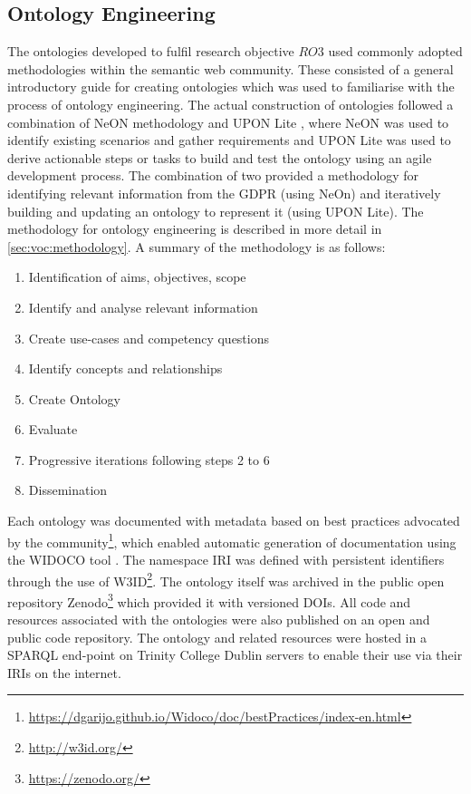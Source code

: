 \subsection{Ontology Engineering}\label{sec:intro:ontology-engineering}
The ontologies developed to fulfil research objective $RO3$ used commonly adopted methodologies within the semantic web community. These consisted of a general introductory guide for creating ontologies \cite{noy_ontology_2001} which was used to familiarise with the process of ontology engineering.
The actual construction of ontologies followed a combination of NeON methodology \cite{suarez-figueroa_neon_2012} and UPON Lite \cite{de_nicola_lightweight_2016}, where NeON was used to identify existing scenarios and gather requirements and UPON Lite was used to derive actionable steps or tasks to build and test the ontology using an agile development process.
The combination of two provided a methodology for identifying relevant information from the GDPR (using NeOn) and iteratively building and updating an ontology to represent it (using UPON Lite).
The methodology for ontology engineering is described in more detail in \autoref{sec:voc:methodology}.
A summary of the methodology is as follows:
\begin{enumerate}
	\item Identification of aims, objectives, scope
    \item Identify and analyse relevant information
    \item Create use-cases and competency questions
    \item Identify concepts and relationships
    \item Create Ontology
    \item Evaluate
    \item Progressive iterations following steps 2 to 6
    \item Dissemination
\end{enumerate}

Each ontology was documented with metadata based on best practices advocated by the community\footnote{\url{https://dgarijo.github.io/Widoco/doc/bestPractices/index-en.html}}, which enabled automatic generation of documentation using the WIDOCO tool \cite{garijo_widoco:_2017}.
The namespace IRI was defined with persistent identifiers through the use of W3ID\footnote{\url{http://w3id.org/}}.
The ontology itself was archived in the public open repository Zenodo\footnote{\url{https://zenodo.org/}} which provided it with versioned DOIs.
All code and resources associated with the ontologies were also published on an open and public code repository.
The ontology and related resources were hosted in a SPARQL end-point on Trinity College Dublin servers to enable their use via their IRIs on the internet.

